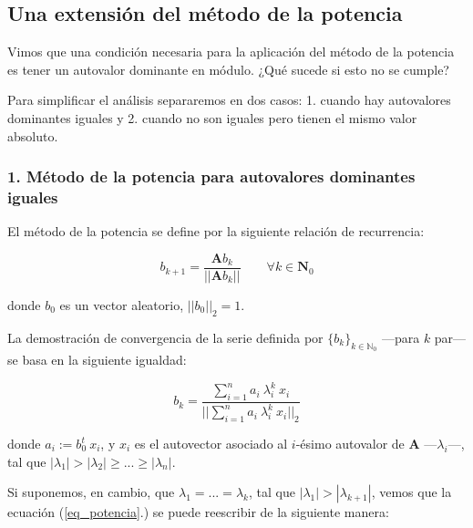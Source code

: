 
\vspace{1em}
\subsection{Una extensión del método de la potencia} \label{ap_A}

Vimos que una condición necesaria para la aplicación del método de la potencia es tener un autovalor dominante en módulo. ¿Qué sucede si esto no se cumple?

\vspace{1em}
\noindent Para simplificar el análisis separaremos en dos casos: 1. cuando hay autovalores dominantes iguales y 2. cuando no son iguales pero tienen el mismo valor absoluto.

\vspace{2em}
\subsubsection*{1. Método de la potencia para autovalores dominantes iguales} El método de la potencia se define por la siguiente relación de recurrencia:

\vspace{1em}
\begin{equation*} 
    b_{k+1} = \frac{\mathbf{A}b_k}{||\mathbf{A}b_k||} \qquad \forall k \in \mathbf{N}_0
\end{equation*}

\vspace{1em}
\noindent donde $b_0$ es un vector aleatorio, $||b_0||_2 = 1$.

\vspace{1em}
\noindent La demostración de convergencia de la serie definida por $\{b_k\}_{k \in \mathbb{N}_0}$ ---para $k$ par--- se basa en la siguiente igualdad: 

\begin{equation} \label{eq_potencia}
    b_k = \frac{\sum_{i=1}^{n} a_i \ \lambda_{i}^{k} \ x_i }{||\sum_{i=1}^{n} a_i \ \lambda_{i}^{k} \ x_i||_2}
\end{equation}

\vspace{1em}
\noindent donde $a_i := b_0^t\ x_i$, y $x_i$ es el autovector asociado al $i$-ésimo autovalor de $\mathbf{A}$ ---$\lambda_i$---, tal que $|\lambda_1| > |\lambda_2| \geq ... \geq |\lambda_n|$.

\vspace{2em}
\noindent Si suponemos, en cambio, que $\lambda_1 = ... = \lambda_k$, tal que $|\lambda_1| > |\lambda_{k + 1}|$, vemos que la ecuación (\ref{eq_potencia}.) se puede reescribir de la siguiente manera:

